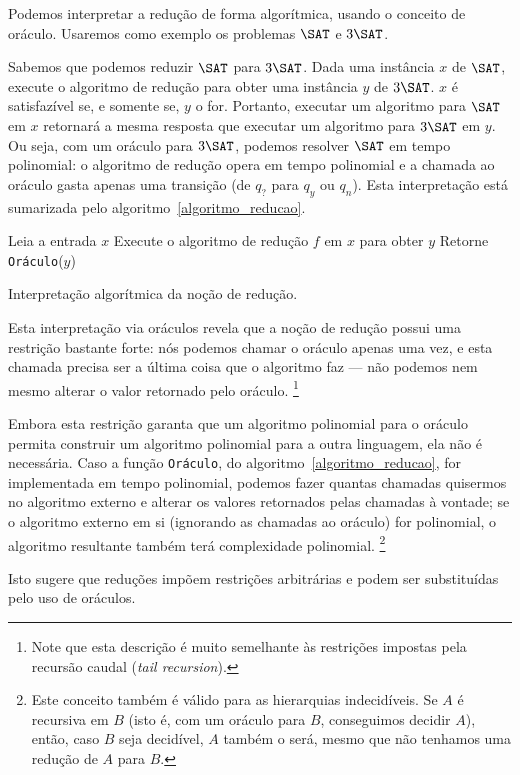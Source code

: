 Podemos interpretar a redução de forma algorítmica,
usando o conceito de oráculo.
Usaremos como exemplo os problemas $\SAT$ e $3\SAT$.

Sabemos que podemos reduzir $\SAT$ para $3\SAT$.
Dada uma instância $x$ de $\SAT$,
execute o algoritmo de redução para obter uma instância $y$ de $3\SAT$.
$x$ é satisfazível se, e somente se, $y$ o for.
Portanto, executar um algoritmo para $\SAT$ em $x$
retornará a mesma resposta
que executar um algoritmo para $3\SAT$ em $y$.
Ou seja, com um oráculo para $3\SAT$,
podemos resolver $\SAT$ em tempo polinomial:
o algoritmo de redução opera em tempo polinomial
e a chamada ao oráculo gasta apenas uma transição
(de $q_?$ para $q_y$ ou $q_n$).
Esta interpretação está sumarizada pelo algoritmo~\ref{algoritmo_reducao}.

\begin{algorithm}[h]
    Leia a entrada $x$\;
    Execute o algoritmo de redução $f$ em $x$ para obter $y$\;
    Retorne \texttt{Oráculo}($y$)\;
    \caption{
        Interpretação algorítmica da noção de redução.
    }
    \label{algoritmo_reducao}
\end{algorithm}

Esta interpretação via oráculos revela que
a noção de redução possui uma restrição bastante forte:
nós podemos chamar o oráculo apenas uma vez,
e esta chamada precisa ser a última coisa que o algoritmo faz
--- não podemos nem mesmo alterar o valor retornado pelo oráculo.%
\footnote{
    Note que esta descrição é muito semelhante
    às restrições impostas pela recursão caudal
    (\emph{tail recursion}).
}

Embora esta restrição garanta que
um algoritmo polinomial para o oráculo
permita construir um algoritmo polinomial para a outra linguagem,
ela não é necessária.
Caso a função \texttt{Oráculo}, do algoritmo~\ref{algoritmo_reducao},
for implementada em tempo polinomial,
podemos fazer quantas chamadas quisermos no algoritmo externo
e alterar os valores retornados pelas chamadas à vontade;
se o algoritmo externo em si
(ignorando as chamadas ao oráculo)
for polinomial,
o algoritmo resultante também terá complexidade polinomial.%
\footnote{
    Este conceito também é válido para as hierarquias indecidíveis.
    Se $A$ é recursiva em $B$
    (isto é, com um oráculo para $B$, conseguimos decidir $A$),
    então, caso $B$ seja decidível,
    $A$ também o será,
    mesmo que não tenhamos uma redução de $A$ para $B$.
}

Isto sugere que reduções impõem restrições arbitrárias
e podem ser substituídas pelo uso de oráculos.
